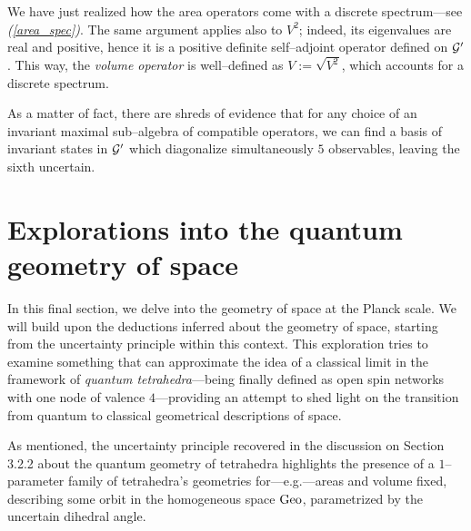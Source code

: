 \begin{remark}
    We have just realized how the area operators come with a discrete spectrum---see \emph{(\ref{area_spec})}. The same argument applies also to $V^2$; indeed, its eigenvalues are real and positive, hence it is a positive definite self--adjoint operator defined on $\mathcal{G}'$. This way, the \emph{volume operator} is well--defined as $V:=\sqrt{V^2}$, which accounts for a discrete spectrum.
\end{remark}

As a matter of fact, there are shreds of evidence that for any choice of an invariant maximal sub--algebra of compatible operators, we can find a basis of invariant states in $\mathcal{G}'$ which diagonalize simultaneously $5$ observables, leaving the sixth uncertain. 



\newpage
\section{Explorations into the quantum geometry of space}
In this final section, we delve into the geometry of space at the Planck scale. We will build upon the deductions inferred about the geometry of space, starting from the uncertainty principle within this context. This exploration tries to examine something that can approximate the idea of a classical limit in the framework of \emph{quantum tetrahedra}---being finally defined as open spin networks with one node of valence $4$---providing an attempt to shed light on the transition from quantum to classical geometrical descriptions of space.

As mentioned, the uncertainty principle recovered in the discussion on Section 3.2.2 about the quantum geometry of tetrahedra highlights the presence of a $1$--parameter family of tetrahedra's geometries for---e.g.---areas and volume fixed, describing some orbit in the homogeneous space $\text{\normalfont Geo}$, parametrized by the uncertain dihedral angle.

